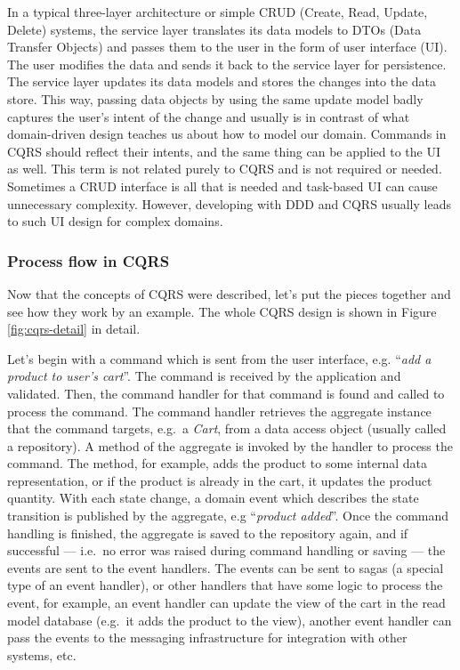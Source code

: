 \documentclass{book}
\begin{document}
In a typical three-layer architecture or simple CRUD (Create, Read,
Update, Delete) systems, the service layer translates its data models to
DTOs (Data Transfer Objects) and passes them to the user in the form of
user interface (UI). The user modifies the data and sends it back to the
service layer for persistence. The service layer updates its data models
and stores the changes into the data store. This way, passing data
objects by using the same update model badly captures the user's intent
of the change and usually is in contrast of what domain-driven design
teaches us about how to model our domain. Commands in CQRS should
reflect their intents, and the same thing can be applied to the UI as
well. This term is not related purely to CQRS and is not required or
needed. Sometimes a CRUD interface is all that is needed and task-based
UI can cause unnecessary complexity. However, developing with DDD and
CQRS usually leads to such UI design for complex domains.


\subsubsection{Process flow in CQRS}\label{process-flow-in-cqrs}

Now that the concepts of CQRS were described, let's put the pieces
together and see how they work by an example. The whole CQRS design is
shown in Figure \ref{fig:cqrs-detail} in detail.

Let's begin with a command which is sent from the user interface, e.g.
``\emph{add a product to user's cart}''. The command is received by the
application and validated. Then, the command handler for that command is
found and called to process the command. The command handler retrieves
the aggregate instance that the command targets, e.g.~a \emph{Cart},
from a data access object (usually called a repository). A method of the
aggregate is invoked by the handler to process the command. The method,
for example, adds the product to some internal data representation, or
if the product is already in the cart, it updates the product quantity.
With each state change, a domain event which describes the state
transition is published by the aggregate, e.g ``\emph{product added}''.
Once the command handling is finished, the aggregate is saved to the
repository again, and if successful --- i.e.~no error was raised during
command handling or saving --- the events are sent to the event
handlers. The events can be sent to sagas (a special type of an event
handler), or other handlers that have some logic to process the event,
for example, an event handler can update the view of the cart in the
read model database (e.g.~it adds the product to the view), another
event handler can pass the events to the messaging infrastructure for
integration with other systems, etc.
\end{document}
